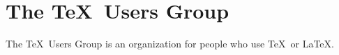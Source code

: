 \documentclass{article}
\newcommand{\TUG}{\TeX\ Users Group\xspace}
\begin{document}
\section{The \TUG}
The \TUG is an organization for people who use
\TeX\ or \LaTeX.
\end{document}
